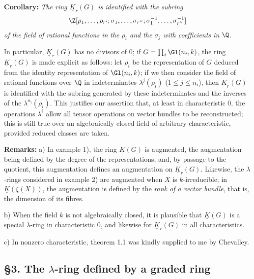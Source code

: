 \textbf{Corollary:} \emph{The ring $\underline{K}_r(G)$ is identified with the subring}
\[
\Z[\rho_1,\ldots,\rho_{r'};\sigma_1,\ldots,\sigma_{r''};\sigma_1^{-1},\ldots,\sigma_{r''}^{-1}]
\]
\emph{of the field of rational functions in the $\rho_i$ and the $\sigma_j$ with coefficients in $\Q$}.

In particular, $\underline{K}_r(G)$ has no divisors of $0$; if $G=\prod_i\Gl(n_i,k)$, the ring $\underline{K}_r(G)$ is made explicit as follows: let $\rho_i$ be the representation of $G$ deduced from the identity representation of $\Gl(n_i,k)$; if we then consider the field of rational functions over $\Q$ in indeterminates $\lambda^j(\rho_i)$ ($1\leq j\leq n_i$), then $\underline{K}_r(G)$ is identified with the subring generated by these indeterminates and the inverses of the $\lambda^{n_i}(\rho_i)$. This justifies our assertion that, at least in characteristic $0$, the operations $\lambda^i$ allow all tensor operations on vector bundles to be reconstructed; this is still true over an algebraically closed field of arbitrary characteristic, provided reduced classes are taken.

\textbf{Remarks:} a) In example 1), the ring $\underline{K}(G)$ is augmented, the augmentation being defined by the degree of the representations, and, by passage to the quotient, this augmentation defines an augmentation on $\underline{K}_r(G)$. Likewise, the $\lambda$-rings considered in example 2) are augmented when $X$ is $k$-irreducible; in $\underline{K}(\xi(X))$, the augmentation is defined by the \emph{rank of a vector bundle}, that is, the dimension of its fibres.

%
b)
When the field $k$ is not algebraically closed, it is plausible that $\underline{K}(G)$ is a special $\lambda$-ring in characteristic $0$, and likewise for $\underline{K}_r(G)$ in all characteristics.

c) In nonzero characteristic, theorem 1.1 was kindly supplied to me by Chevalley.

\subsection*{\S 3. The $\lambda$-ring defined by a graded ring}

